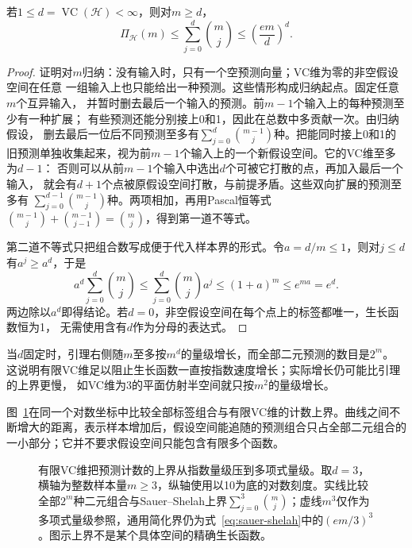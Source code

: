 \begin{lemma}
\label{lem:sauer-shelah}
若$1\leq d=\operatorname{VC}(\mathcal H)<\infty$，则对$m\geq d$，
\begin{equation}
 \Pi_{\mathcal H}(m)
 \leq\sum_{j=0}^{d}\binom{m}{j}
 \leq\left(\frac{em}{d}\right)^d.
 \label{eq:sauer-shelah}
\end{equation}
\end{lemma}
\begin{proof}
证明对$m$归纳：没有输入时，只有一个空预测向量；VC维为零的非空假设空间在任意
一组输入上也只能给出一种预测。这些情形构成归纳起点。固定任意$m$个互异输入，
并暂时删去最后一个输入的预测。前$m-1$个输入上的每种预测至少有一种扩展；
有些预测还能分别接上0和1，因此在总数中多贡献一次。由归纳假设，
删去最后一位后不同预测至多有$\sum_{j=0}^d\binom{m-1}{j}$种。把能同时接上0和1的
旧预测单独收集起来，视为前$m-1$个输入上的一个新假设空间。它的VC维至多为$d-1$：
否则可以从前$m-1$个输入中选出$d$个可被它打散的点，再加入最后一个输入，
就会有$d+1$个点被原假设空间打散，与前提矛盾。这些双向扩展的预测至多有
$\sum_{j=0}^{d-1}\binom{m-1}{j}$种。两项相加，再用Pascal恒等式
$\binom{m-1}{j}+\binom{m-1}{j-1}=\binom{m}{j}$，得到第一道不等式。

第二道不等式只把组合数写成便于代入样本界的形式。令$a=d/m\leq1$，则对$j\leq d$
有$a^j\geq a^d$，于是
\[
 a^d\sum_{j=0}^d\binom mj
 \leq\sum_{j=0}^d\binom mj a^j
 \leq(1+a)^m\leq e^{ma}=e^d.
\]
两边除以$a^d$即得结论。若$d=0$，非空假设空间在每个点上的标签都唯一，生长函数恒为1，
无需使用含有$d$作为分母的表达式。
\end{proof}

当$d$固定时，引理右侧随$m$至多按$m^d$的量级增长，而全部二元预测的数目是$2^m$。
这说明有限VC维足以阻止生长函数一直按指数速度增长；实际增长仍可能比引理的上界更慢，
如VC维为3的平面仿射半空间就只按$m^2$的量级增长。

图~\ref{fig:learning-sauer-growth}在同一个对数坐标中比较全部标签组合与有限VC维的计数上界。曲线之间不断增大的距离，表示样本增加后，假设空间能追随的预测组合只占全部二元组合的一小部分；它并不要求假设空间只能包含有限多个函数。

\begin{figure}[htbp]
 \centering
 
 \caption{有限VC维把预测计数的上界从指数量级压到多项式量级。取$d=3$，横轴为整数样本量$m\geq3$，纵轴使用以10为底的对数刻度。实线比较全部$2^m$种二元组合与Sauer--Shelah上界$\sum_{j=0}^{3}\binom mj$；虚线$m^3$仅作为多项式量级参照，通用简化界仍为式~\eqref{eq:sauer-shelah}中的$(em/3)^3$。图示上界不是某个具体空间的精确生长函数。}
 \label{fig:learning-sauer-growth}
\end{figure}

